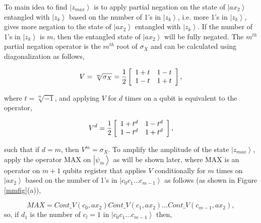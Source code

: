 \documentclass[a4paper]{article}
\begin{document}
To main idea to find $\left| {z_{max} } \right\rangle$ is to apply partial negation on 
the state of $\left| {ax_2 } \right\rangle$ entangled with $\left| {z_k } \right\rangle$ based on 
the number of 1's in $\left| {z_k } \right\rangle$, i.e. more 1's in $\left| {z_k } \right\rangle$, 
gives more negation to the state of $\left| {ax_2 } \right\rangle$ entangled with $\left| {z_k } \right\rangle$. 
If the number of 1's in $\left| {z_k } \right\rangle$ is $m$, then 
the entangled state of $\left| {ax_2 } \right\rangle$ will be fully negated. 
The $m^{th}$ partial negation operator is the $m^{th}$ root of $\sigma _X$ and 
can be calculated using diagonalization as follows, 

\begin{equation}
 V=\sqrt[m]{\sigma _X} = \frac{1}{2}\left[ {\begin{array}{*{20}c}
   {1 + t} & {1 - t}  \\
   {1 - t} & {1 + t}  \\
\end{array}} \right],
\end{equation}

\noindent
where $t={\sqrt[m]{{ - 1}}}$, and applying $V$ for $d$ times on a qubit is equivalent to the operator,
 
\begin{equation}
 V^d  = \frac{1}{2}\left[ {\begin{array}{*{20}c}
   {1 + t^d } & {1 - t^d }  \\
   {1 - t^d } & {1 + t^d }  \\
\end{array}} \right],
\end{equation}

\noindent
such that if $d=m$, then $V^m=\sigma _X$. 
To amplify the amplitude of the state $\left| {z_{max} } \right\rangle$, apply the operator MAX 
on $\left| {\psi _m } \right\rangle$ as will be shown later, 
where MAX is an operator on $m+1$ qubits register that applies $V$ conditionally 
for $m$ times on $\left|ax_2 \right\rangle$ 
based on the number of 1's in $\left| {c_0 c_1  \ldots c_{m-1} } \right\rangle$ 
as follows (as shown in Figure \ref{mmfig}(a)),

\begin{equation}
MAX = Cont\_V(c_0 ,ax_2 )Cont\_V(c_1 ,ax_2 ) \ldots Cont\_V(c_{m - 1} ,ax_2),
\end{equation}
\noindent
so, if $d_1$ is the number of $c_l=1$ in $\left| {c_0 c_1  \ldots c_{m-1} } \right\rangle$ then,
\end{document}
